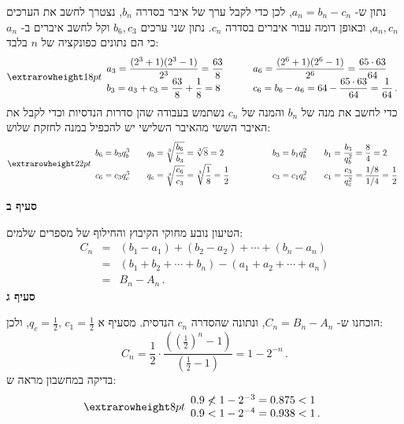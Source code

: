 נתון ש-%
$a_n=b_n-c_n$,
לכן כדי לקבל ערך של איבר בסדרה
$b_n$,
נצטרך לחשב את הערכים
$a_n,c_n$,
ובאופן דומה עבור איברים בסדרה
$c_n$.
נתון שני ערכים
$b_6,c_3$
וקל לחשב איברים ב-%
$a_n$
כי הם נתונים כפונקציה של 
$n$ 
בלבד:
\[
\erh{18pt}
\begin{array}{l@{\hspace{3em}}l}
\displaystyle a_3=\frac{(2^3+1)(2^3-1)}{2^3}=\frac{63}{8}&\displaystyle a_6=\frac{(2^6+1)(2^6-1)}{2^6}= \frac{65\cdot 63}{64}\\
\displaystyle b_3=a_3+c_3=\frac{63}{8}+\frac{1}{8}=8 &\displaystyle  c_6=b_6-a_6=64-\frac{65\cdot 63}{64}=\frac{1}{64}\,.
\end{array}
\]
כדי לחשב את מנה של
$b_n$
והמנה של
$c_n$
נשתמש בעבודה שהן סדרות הנדסיות וכדי לקבל את האיבר הששי מהאיבר השלישי יש להכפיל במנה לחזקת שלוש:
\vspace{-1ex}
\[
\erh{22pt}
\begin{array}{l@{\hspace{2em}}l@{\hspace{5em}}l@{\hspace{2em}}l}
b_6=b_3q_b^3 & \displaystyle q_b=\sqrt[3]{\frac{b_6}{b_3}}=\sqrt[3]{8}=2& b_3=b_1 q_b^2 & \displaystyle b_1=\frac{b_3}{q_b^2}=\frac{8}{4}=2\\
c_6=c_3q_c^3 & \displaystyle q_c=\sqrt[3]{\frac{c_6}{c_3}} =\sqrt[3]{\frac{1}{8}} = \frac{1}{2}& c_3=c_1 q_c^2 & \displaystyle c_1=\frac{c_3}{q_c^2}=\frac{1/8}{1/4}=\frac{1}{2}
\end{array}
\]

\np

\textbf{סעיף ב}

הטיעון נובע מחוקי הקיבוץ והחילוף של מספרים שלמים:
\begin{eqnarray*}
C_n &=& (b_1-a_1) + (b_2 - a_2) + \cdots + (b_n-a_n)\\
&=&(b_1 + b_2 + \cdots + b_n) - (a_1 + a_2 + \cdots + a_n)\\
&=& B_n - A_n\,.
\end{eqnarray*}
\textbf{סעיף ג}

הוכחנו ש-%
$C_n=B_n-A_n$,
ונתונה שהסדרה 
$c_n$
הנדסית. מסעיף א
$\displaystyle q_c=\frac{1}{2},\,c_1=\frac{1}{2}$,
ולכן:
\[
C_n = \frac{1}{2}\cdot\frac{\displaystyle\left(\left(\frac{1}{2}\right)^n-1\right)}{\displaystyle\left(\frac{1}{2}-1\right)}=1-2^{-n}\,.
\]
בדיקה במחשבון מראה ש:
\[
\erh{8pt}
\begin{array}{l}
0.9 \not< 1-2^{-3}=0.875<1\\
0.9 < 1-2^{-4}=0.938 < 1\,.
\end{array}
\]

